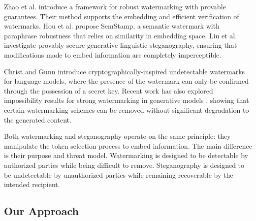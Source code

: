 \documentclass[sigconf,review,anonymous]{acmart}
\begin{document}
Zhao et al. \cite{zhao2023provable} introduce a framework for robust watermarking with provable guarantees. Their method supports the embedding and efficient verification of watermarks. Hou et al. \cite{hou2024semstamp} propose SemStamp, a semantic watermark with paraphrase robustness that relies on similarity in embedding space. Liu et al. \cite{liu2023provable} investigate provably secure generative linguistic steganography, ensuring that modifications made to embed information are completely imperceptible.

Christ and Gunn \cite{christ2023undetectable} introduce cryptographically-inspired undetectable watermarks for language models, where the presence of the watermark can only be confirmed through the possession of a secret key. Recent work has also explored impossibility results for strong watermarking in generative models \cite{zhang2023watermarks}, showing that certain watermarking schemes can be removed without significant degradation to the generated content.

Both watermarking and steganography operate on the same principle: they manipulate the token selection process to embed information. The main difference is their purpose and threat model. Watermarking is designed to be detectable by authorized parties while being difficult to remove. Steganography is designed to be undetectable by unauthorized parties while remaining recoverable by the intended recipient.

\subsection{Our Approach}
\end{document}
